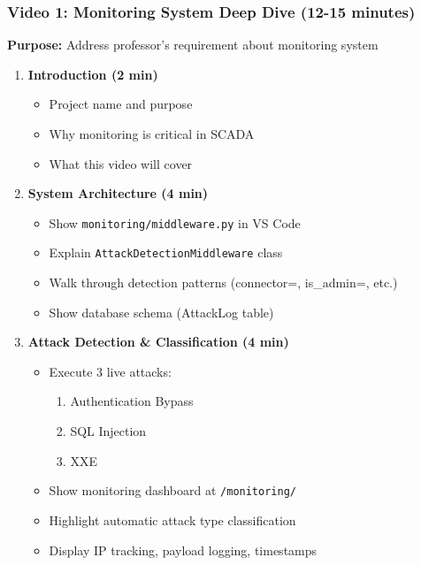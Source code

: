 \documentclass[12pt,a4paper]{article}
\begin{document}
\subsubsection{Video 1: Monitoring System Deep Dive (12-15 minutes)}

\textbf{Purpose:} Address professor's requirement about monitoring system

\begin{enumerate}[leftmargin=*]
    \item \textbf{Introduction (2 min)}
    \begin{itemize}
        \item Project name and purpose
        \item Why monitoring is critical in SCADA
        \item What this video will cover
    \end{itemize}
    
    \item \textbf{System Architecture (4 min)}
    \begin{itemize}
        \item Show \texttt{monitoring/middleware.py} in VS Code
        \item Explain \texttt{AttackDetectionMiddleware} class
        \item Walk through detection patterns (connector=, is\_admin=, etc.)
        \item Show database schema (AttackLog table)
    \end{itemize}
    
    \item \textbf{Attack Detection \& Classification (4 min)}
    \begin{itemize}
        \item Execute 3 live attacks:
        \begin{enumerate}
            \item Authentication Bypass
            \item SQL Injection
            \item XXE
        \end{enumerate}
        \item Show monitoring dashboard at \texttt{/monitoring/}
        \item Highlight automatic attack type classification
        \item Display IP tracking, payload logging, timestamps
    \end{itemize}
    

\end{enumerate}
\end{document}

